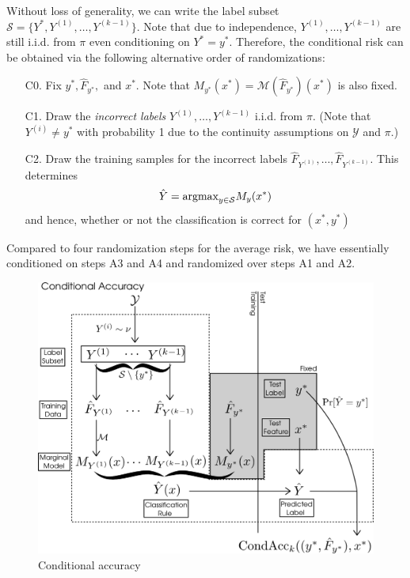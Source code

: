 Without loss of generality, we can write the label subset $\mathcal{S}
= \{Y^*, Y^{(1)},\hdots, Y^{(k-1)}\}$.  Note that due to independence,
$Y^{(1)},\hdots, Y^{(k-1)}$ are still i.i.d. from $\pi$ even
conditioning on $Y^* = y^*.$ Therefore, the conditional risk can be
obtained via the following alternative order of randomizations:
\begin{enumerate}
\item[C0.] 
Fix $y^*, \hat{F}_{y^*},$ and $x^*$.  Note that $M_{y^*}(x^*)
= \mathcal{M}(\hat{F}_{y^*})(x^*)$ is also fixed.
\item[C1.]
Draw the \emph{incorrect labels} $Y^{(1)},\hdots, Y^{(k-1)}$ i.i.d. from
$\pi$.  (Note that $Y^{(i)} \neq y^*$ with probability 1 due to the
continuity assumptions on $\mathcal{Y}$ and $\pi$.)
\item[C2.]
Draw the training samples for the incorrect labels
$\hat{F}_{Y^{(1)}},\hdots, \hat{F}_{Y^{(k-1)}}$.  This determines
\[
\hat{Y} = \text{argmax}_{y \in \mathcal{S}} M_y(x^*)
\]
and hence, whether or not the classification is correct for $(x^*, y^*)$
\end{enumerate}
Compared to four randomization steps for the average risk, we have
essentially conditioned on steps A3 and A4 and randomized over steps
A1 and A2.

\begin{figure}[h]
\centering
\includegraphics[scale = 0.3]{../extrapolation_simple/conditional_risk.png}
\caption{Conditional accuracy}\label{fig:conditional_risk}
\end{figure}

